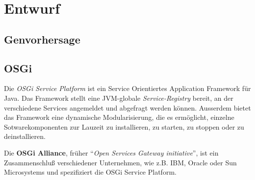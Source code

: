 \chapter{Entwurf}
\section{Genvorhersage}
\section{OSGi}
Die \textit{OSGi Service Platform} ist ein Service Orientiertes Application
Framework für Java. Das Framework stellt eine JVM-globale
\textit{Service-Registry} bereit, an der verschiedene Services angemeldet und
abgefragt werden können. Ausserdem bietet das Framework eine dynamische
Modularisierung, die es ermöglicht, einzelne Sotwarekomponenten zur
Lauzeit zu installieren, zu starten, zu stoppen oder zu deinstallieren.

Die \textbf{OSGi Alliance}, früher
\enquote{\textit{Open Services Gateway initiative}}, ist ein Zusammenschluß verschiedener Unternehmen, wie z.B. IBM,
Oracle oder Sun Microsystems und spezifiziert die OSGi Service Platform.

